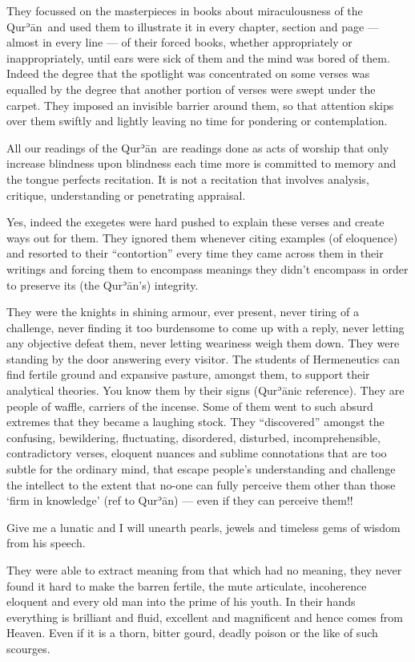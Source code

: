 \documentclass[12pt]{memoir}
\def\´{ʾ} %
\def \Quran{Qur\-\´ān} %
\begin{document}
They focussed on the masterpieces in books about miraculousness of the \Quran\
and used them to illustrate it in every chapter, section and page —
almost in every line — of their forced books,
whether appropriately or inappropriately,
until ears were sick of them and the mind was bored of them.
Indeed the degree that the spotlight was concentrated on some verses
was equalled by the degree that another portion of verses
were swept under the carpet.
They imposed an invisible barrier around them,
so that attention skips over them swiftly and lightly
leaving no time for pondering or contemplation.

All our readings of the \Quran\ are readings done as acts of worship
that only increase blindness upon blindness each time more
is committed to memory and the tongue perfects recitation.
It is not a recitation that involves analysis, critique,
understanding or penetrating appraisal.

Yes, indeed the exegetes were hard pushed to explain these verses
and create ways out for them.
They ignored them whenever citing examples (of eloquence)
and resorted to their “contortion” every time they came across them
in their writings and forcing them to encompass meanings
they didn’t encompass in order to preserve its (the \Quran’s) integrity.

They were the knights in shining armour, ever present,
never tiring of a challenge,
never finding it too burdensome to come up with a reply,
never letting any objective defeat them,
never letting weariness weigh them down.
They were standing by the door answering every visitor.
The students of Hermeneutics can find fertile ground and expansive pasture,
amongst them, to support their analytical theories.
You know them by their signs (\Quran{}ic reference).
They are people of waffle, carriers of the incense.
Some of them went to such absurd extremes that they became a laughing stock.
They “discovered” amongst the confusing, bewildering, fluctuating, disordered,
disturbed, incomprehensible, contradictory verses, eloquent nuances
and sublime connotations that are too subtle for the ordinary mind,
that escape people’s understanding and challenge the intellect to the extent
that no-one can fully perceive them other than those ‘firm in knowledge’
(ref to \Quran) — even if they can perceive them!!

Give me a lunatic and I will unearth pearls, jewels
and timeless gems of wisdom from his speech.

They were able to extract meaning from that which had no meaning,
they never found it hard to make the barren fertile,
the mute articulate, incoherence eloquent
and every old man into the prime of his youth.
In their hands everything is brilliant and fluid,
excellent and magnificent and hence comes from Heaven.
Even if it is a thorn, bitter gourd,
deadly poison or the like of such scourges.
\end{document}
